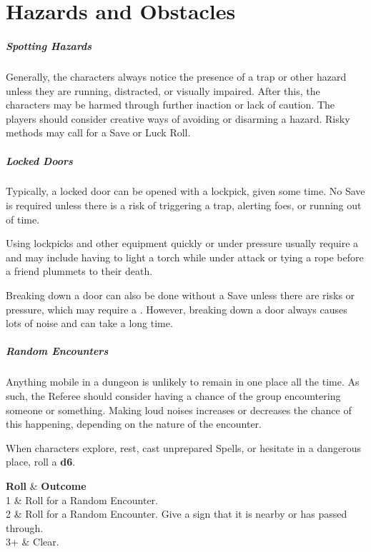 \documentclass[itdr]{subfiles}
\begin{document}
\chapter{Hazards and Obstacles}
\label{ch:hazards_and_obstacles}

\paragraph{Spotting Hazards}
Generally, the characters always notice the presence of a trap or other hazard unless they are running, distracted, or visually impaired. After this, the characters may be harmed through further inaction or lack of caution. The players should consider creative ways of avoiding or disarming a hazard. Risky methods may call for a Save or Luck Roll.

\paragraph{Locked Doors}
Typically, a locked door can be opened with a lockpick, given some time. No Save is required unless there is a risk of triggering a trap, alerting foes, or running out of time.

Using lockpicks and other equipment quickly or under pressure usually require a  and may include having to light a torch while under attack or tying a rope before a friend plummets to their death.

Breaking down a door can also be done without a Save unless there are risks or pressure, which may require a . However, breaking down a door always causes lots of noise and can take a long time.

\paragraph{Random Encounters}
Anything mobile in a dungeon is unlikely to remain in one place all the time. As such, the Referee should consider having a chance of the group encountering someone or something. Making loud noises increases or decreases the chance of this happening, depending on the nature of the encounter.

When characters explore, rest, cast unprepared Spells, or hesitate in a dangerous place, roll a \textbf{d6}.

\begin{dtable}[cL]
	\textbf{Roll} & \textbf{Outcome} \\
	1	& Roll for a Random Encounter.\\
	2	& Roll for a Random Encounter. Give a sign that it is nearby or has passed through.\\
	3+	& Clear.\\
\end{dtable}
\end{document}
